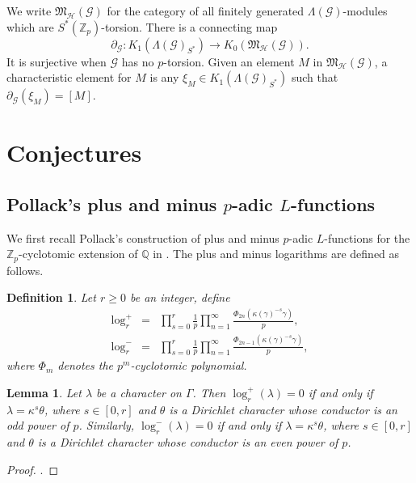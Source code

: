 \documentclass{amsart}
\newtheorem{lemma}[theorem]{Lemma}
\newtheorem{definition}[theorem]{Definition}
\begin{document}
We write ${\mathfrak{M}_{\mathcal{H}}({\mathcal{G}})}$ for the category of all finitely generated $\Lambda({\mathcal{G}})$-modules which are $S^*({{\mathbb Z}_p})$-torsion. There is a connecting map
\[
\partial_{\mathcal{G}}:K_1(\Lambda({\mathcal{G}})_{S^*})\rightarrow K_0({\mathfrak{M}_{\mathcal{H}}({\mathcal{G}})}).
\]
It is surjective when ${\mathcal{G}}$ has no $p$-torsion. Given an element $M$ in ${\mathfrak{M}_{\mathcal{H}}({\mathcal{G}})}$, a characteristic element for $M$ is any $\xi_M\in K_1(\Lambda({\mathcal{G}})_{S^*})$ such that $\partial_{\mathcal{G}}(\xi_M)=[M]$.

\section{Conjectures}

\subsection{Pollack's plus and minus $p$-adic $L$-functions}\label{sec:pol}

We first recall Pollack's construction of plus and minus $p$-adic $L$-functions for the ${{\mathbb Z}_p}$-cyclotomic extension of ${\mathbb Q}$ in \cite{pollack03}. The plus and minus logarithms are defined as follows.

\begin{definition}
Let $r\ge0$ be an integer, define
\begin{eqnarray*}
\log^+_r&=&\prod_{s=0}^{r}\frac{1}{p}\prod_{n=1}^\infty\frac{\Phi_{2n}(\kappa(\gamma)^{-s}\gamma)}{p},\\
\log^-_r&=&\prod_{s=0}^{r}\frac{1}{p}\prod_{n=1}^\infty\frac{\Phi_{2n-1}(\kappa(\gamma)^{-s}\gamma)}{p},
\end{eqnarray*}
where $\Phi_m$ denotes the $p^m$-cyclotomic polynomial.
\end{definition}

\begin{lemma}\label{lem:pollackzero}
Let $\lambda$ be a character on $\Gamma$. Then $\log^+_r(\lambda)=0$ if and only if $\lambda=\kappa^s\theta$, where $s\in[0,r]$ and $\theta$ is a Dirichlet character whose conductor is an odd power of $p$. Similarly, $\log^-_r(\lambda)=0$ if and only if $\lambda=\kappa^s\theta$, where $s\in[0,r]$ and $\theta$ is a Dirichlet character whose conductor is an even power of $p$.
\end{lemma}
\begin{proof}
\cite[Lemma~4.1]{pollack03}.
\end{proof}
\end{document}
